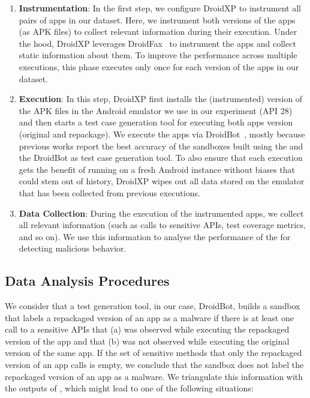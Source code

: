 \begin{enumerate}[S1]
 \item \textbf{Instrumentation}: In the first step,
we configure DroidXP to instrument all pairs of apps in our dataset.
Here, we instrument both versions of the apps (as APK files) to collect relevant information during their execution. Under the hood, DroidXP leverages
DroidFax~\cite{DBLP:conf/icsm/CaiR17a} to instrument the apps and collect static
information about them. To improve the performance across multiple executions,
this phase executes only once for each version of the apps in our dataset.

\item \textbf{Execution}: In this step, DroidXP first installs the (instrumented) version of the APK files in the Android emulator we use in our experiment (API 28) and then starts a test case generation tool for executing both apps version (original and repackage). We execute the apps via DroidBot~\cite{DBLP:conf/icse/LiYGC17}, mostly because previous works report the best accuracy of the sandboxes built using the \mas and the DroidBot as test case generation tool. To also ensure that each execution gets the benefit of running on a fresh Android instance without biases that could stem out of history, DroidXP wipes out all data stored on the emulator that has been collected from previous executions.


\item \textbf{Data Collection}: During the execution of the instrumented apps, we collect all relevant information (such as calls to sensitive APIs, test coverage metrics, and so on). We use this information to analyse the performance of the \mas for detecting malicious behavior.
\end{enumerate}

\subsection{Data Analysis Procedures} \label{sec:dataAnalysisProc}



We consider that a test
generation tool, in our case, DroidBot, builds a sandbox that labels a repackaged version
of an app as a malware if there is at least one call to a sensitive APIs that (a) was observed
while executing the repackaged version of the app and that (b) was not observed while
executing the original version of the same app. 
If the set of sensitive methods that only the repackaged version of an app calls is empty,
we conclude that the sandbox does not label the repackaged version of an app as a malware. We triangulate
this information with the outputs of \vt, which might lead to one of the following
situations:


